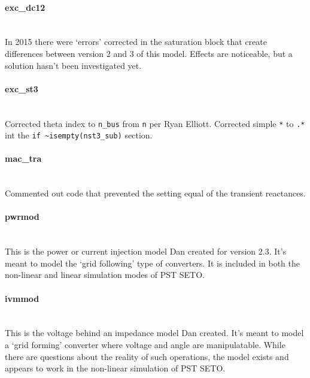 \documentclass[12pt]{article}
\begin{document}
\paragraph{exc\_dc12} \ \\
In 2015 there were `errors' corrected in the saturation block that create differences between version 2 and 3 of this model.
Effects are noticeable, but a solution hasn't been investigated yet.

\paragraph{exc\_st3} \ \\
Corrected theta index to \verb|n_bus| from \verb|n| per Ryan Elliott.
Corrected simple \verb|*| to \verb|.*| int the \verb|if ~isempty(nst3_sub)| section.

\paragraph{mac\_tra} \ \\
Commented out code that prevented the setting equal of the transient reactances.

\paragraph{pwrmod} \ \\
This is the power or current injection model Dan created for version 2.3.
It's meant to model the `grid following' type of converters.
It is included in both the non-linear and linear simulation modes of PST SETO.

\paragraph{ivmmod} \ \\
This is the voltage behind an impedance model Dan created.
It's meant to model a `grid forming' converter where voltage and angle are manipulatable.
While there are questions about the reality of such operations, the model exists and appears to work in the non-linear simulation  of PST SETO.
\end{document}
